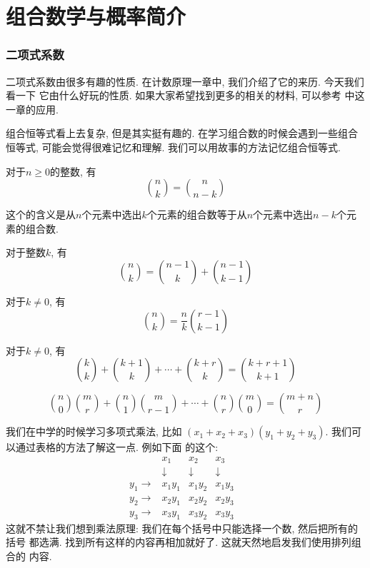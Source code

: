 \part{组合数学与概率简介}

\section{二项式系数}
二项式系数由很多有趣的性质. 在计数原理一章中, 我们介绍了它的来历. 今天我们看一下
它由什么好玩的性质. 如果大家希望找到更多的相关的材料, 可以参考\cite{Brualdi1992IntroductoryC}
中这一章的应用. 

组合恒等式看上去复杂, 但是其实挺有趣的. 在学习组合数的时候会遇到一些组合恒等式, 
可能会觉得很难记忆和理解. 我们可以用故事的方法记忆组合恒等式. 

\begin{theorem} 对于$n\geq 0$的整数, 有
    $$\binom nk = \binom {n}{n-k}$$
\end{theorem}

这个的含义是从$n$个元素中选出$k$个元素的组合数等于从$n$个元素中选出$n-k$个元素的组合数. 

\begin{theorem}对于整数$k$, 有
    $$\binom nk = \binom {n-1}{k} + \binom {n-1}{k-1}$$
\end{theorem}

\begin{theorem} 对于$k\neq 0$, 有
    $$\binom nk = \frac nk {\binom {r-1}{k-1}}$$
\end{theorem}

\begin{theorem} 对于$k\neq 0$, 有
    $$\binom kk+\binom{k+1}k+\cdots+\binom{k+r}k=\binom{k+r+1}{k+1}$$
\end{theorem}

\begin{theorem}[Vandermonde卷积] 
    $$\binom n0 \binom mr+\binom{n}1\binom{m}{r-1}+\cdots+\binom nr\binom m0=\binom{m+n}{r}$$
\end{theorem}

 我们在中学的时候学习多项式乘法, 比如
$(x_1+x_2+x_3)(y_1+y_2+y_3)$. 我们可以通过表格的方法了解这一点. 例如下面
的这个: 
$$
\begin{matrix}
    &x_1  &x_2  &x_3  & \\
    & \downarrow  & \downarrow & \downarrow & \\
  y_1\rightarrow   & x_1y_1 &  x_1y_2& x_1y_3 & \\
  y_2\rightarrow   & x_2y_1 &  x_2y_2& x_2y_3 & \\
  y_3\rightarrow   & x_3y_1 &  x_3y_2& x_3y_3 &
\end{matrix}
$$
这就不禁让我们想到乘法原理: 我们在每个括号中只能选择一个数, 然后把所有的括号
都选满. 找到所有这样的内容再相加就好了. 这就天然地启发我们使用排列组合的
内容.


